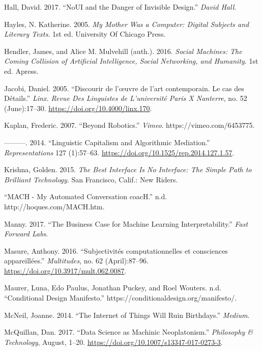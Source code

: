 \documentclass[]{article}
\begin{document}
\leavevmode\hypertarget{ref-Hall2017}{}%
Hall, David. 2017. ``NoUI and the Danger of Invisible Design.''
\emph{David Hall}.

\leavevmode\hypertarget{ref-Hayles2005}{}%
Hayles, N. Katherine. 2005. \emph{My Mother Was a Computer: Digital
Subjects and Literary Texts}. 1st ed. University Of Chicago Press.

\leavevmode\hypertarget{ref-Hendler2016}{}%
Hendler, James, and Alice M. Mulvehill (auth.). 2016. \emph{Social
Machines: The Coming Collision of Artificial Intelligence, Social
Networking, and Humanity}. 1st ed. Apress.

\leavevmode\hypertarget{ref-Jacobi2005}{}%
Jacobi, Daniel. 2005. ``Discourir de l'œuvre de l'art contemporain. Le
cas des Détails.'' \emph{Linx. Revue Des Linguistes de L'université
Paris X Nanterre}, no. 52 (June):17--30.
\url{https://doi.org/10.4000/linx.170}.

\leavevmode\hypertarget{ref-Kaplan2007}{}%
Kaplan, Frederic. 2007. ``Beyond Robotics.'' \emph{Vimeo}.
https://vimeo.com/6453775.

\leavevmode\hypertarget{ref-Kaplan2014}{}%
---------. 2014. ``Linguistic Capitalism and Algorithmic Mediation.''
\emph{Representations} 127 (1):57--63.
\url{https://doi.org/10.1525/rep.2014.127.1.57}.

\leavevmode\hypertarget{ref-Krishna2015}{}%
Krishna, Golden. 2015. \emph{The Best Interface Is No Interface: The
Simple Path to Brilliant Technology}. San Francisco, Calif.: New Riders.

\leavevmode\hypertarget{ref-zotero-28}{}%
``MACH - My Automated Conversation coacH.'' n.d.
http://hoques.com/MACH.htm.

\leavevmode\hypertarget{ref-Manny2017}{}%
Manny. 2017. ``The Business Case for Machine Learning
Interpretability.'' \emph{Fast Forward Labs}.

\leavevmode\hypertarget{ref-Masure2016}{}%
Masure, Anthony. 2016. ``Subjectivités computationnelles et consciences
appareillées.'' \emph{Multitudes}, no. 62 (April):87--96.
\url{https://doi.org/10.3917/mult.062.0087}.

\leavevmode\hypertarget{ref-Maurer}{}%
Maurer, Luna, Edo Paulus, Jonathan Puckey, and Roel Wouters. n.d.
``Conditional Design Manifesto.''
https://conditionaldesign.org/manifesto/.

\leavevmode\hypertarget{ref-McNeil2014}{}%
McNeil, Joanne. 2014. ``The Internet of Things Will Ruin Birthdays.''
\emph{Medium}.

\leavevmode\hypertarget{ref-McQuillan2017}{}%
McQuillan, Dan. 2017. ``Data Science as Machinic Neoplatonism.''
\emph{Philosophy \& Technology}, August, 1--20.
\url{https://doi.org/10.1007/s13347-017-0273-3}.
\end{document}
